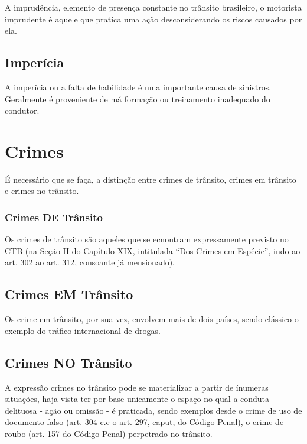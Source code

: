 \documentclass[
  letterpaper,
  DIV=11,
  numbers=noendperiod]{scrreport}
\begin{document}
A imprudência, elemento de presença constante no trânsito brasileiro, o
motorista imprudente é aquele que pratica uma ação desconsiderando os
riscos causados por ela.

\hypertarget{imperuxedcia}{%
\subsection{\texorpdfstring{\textbf{Imperícia}}{Imperícia}}\label{imperuxedcia}}

A imperícia ou a falta de habilidade é uma importante causa de
sinistros. Geralmente é proveniente de má formação ou treinamento
inadequado do condutor.

\hypertarget{crimes}{%
\section{Crimes}\label{crimes}}

É necessário que se faça, a distinção entre crimes de trânsito, crimes
em trânsito e crimes no trânsito.

\hypertarget{crimes-de-truxe2nsito}{%
\subsubsection{\texorpdfstring{Crimes \textbf{DE}
Trânsito}{Crimes DE Trânsito}}\label{crimes-de-truxe2nsito}}

Os crimes de trânsito são aqueles que se ecnontram expressamente
previsto no CTB (na Seção II do Capítulo XIX, intitulada ``Dos Crimes em
Espécie'', indo ao art. 302 ao art. 312, consoante já mensionado).

\hypertarget{crimes-em-truxe2nsito}{%
\subsection{\texorpdfstring{Crimes \textbf{EM}
Trânsito}{Crimes EM Trânsito}}\label{crimes-em-truxe2nsito}}

Os crime em trânsito, por sua vez, envolvem mais de dois países, sendo
clássico o exemplo do tráfico internacional de drogas.

\hypertarget{crimes-no-truxe2nsito}{%
\subsection{\texorpdfstring{Crimes \textbf{NO}
Trânsito}{Crimes NO Trânsito}}\label{crimes-no-truxe2nsito}}

A expressão crimes no trânsito pode se materializar a partir de ínumeras
situações, haja vista ter por base unicamente o espaço no qual a conduta
delituosa - ação ou omissão - é praticada, sendo exemplos desde o crime
de uso de documento falso (art. 304 c.c o art. 297, caput, do Código
Penal), o crime de roubo (art. 157 do Código Penal) perpetrado no
trânsito.
\end{document}
